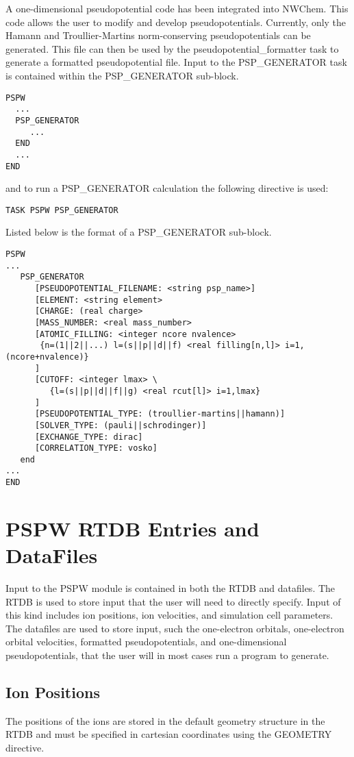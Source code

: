 A one-dimensional pseudopotential code has been integrated into NWChem.
This code allows the user to modify and develop pseudopotentials.  Currently, 
only the Hamann and Troullier-Martins norm-conserving pseudopotentials can be
generated.  This file can then be used by the pseudopotential\_formatter 
task to generate a formatted pseudopotential file. 
Input to the PSP\_GENERATOR task is contained
within the PSP\_GENERATOR sub-block.
\begin{verbatim}
PSPW
  ...
  PSP_GENERATOR
     ...
  END
  ...
END
\end{verbatim}
and to run a PSP\_GENERATOR calculation the following directive 
is used:
\begin{verbatim}
TASK PSPW PSP_GENERATOR
\end{verbatim}
Listed below is the format of a PSP\_GENERATOR sub-block.
\begin{verbatim}
PSPW
... 
   PSP_GENERATOR
      [PSEUDOPOTENTIAL_FILENAME: <string psp_name>]
      [ELEMENT: <string element>
      [CHARGE: (real charge>
      [MASS_NUMBER: <real mass_number>
      [ATOMIC_FILLING: <integer ncore nvalence>
       {n=(1||2||...) l=(s||p||d||f) <real filling[n,l]> i=1,(ncore+nvalence)}
      ]
      [CUTOFF: <integer lmax> \
         {l=(s||p||d||f||g) <real rcut[l]> i=1,lmax}
      ]
      [PSEUDOPOTENTIAL_TYPE: (troullier-martins||hamann)]
      [SOLVER_TYPE: (pauli||schrodinger)]
      [EXCHANGE_TYPE: dirac]
      [CORRELATION_TYPE: vosko]
   end
... 
END
\end{verbatim}





\section{PSPW RTDB Entries and DataFiles}
\label{sec:pspw_data}
Input to the PSPW module is contained in both the RTDB and datafiles.
The RTDB is used to store input that the user will need to directly specify.
Input of this kind includes ion positions, ion velocities, and simulation cell
parameters.  The datafiles are used to store input, such the one-electron 
orbitals, one-electron orbital velocities, formatted pseudopotentials, 
and one-dimensional pseudopotentials, that the user will in most cases
run a program to generate.

\subsection{Ion Positions}
The positions of the ions are stored in the default geometry structure
in the RTDB and must be specified in cartesian 
coordinates using the GEOMETRY directive.

